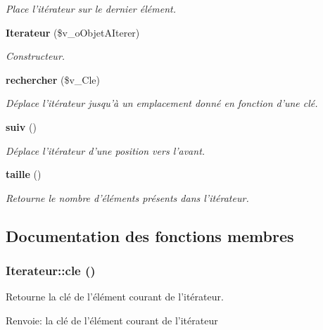 \begin{CompactItemize}
\begin{CompactList}\small\item\em Place l'itérateur sur le dernier élément. \item\end{CompactList}\item 
{\bf Iterateur} (\$v\_\-oObjetAIterer)
\begin{CompactList}\small\item\em Constructeur. \item\end{CompactList}\item 
{\bf rechercher} (\$v\_\-Cle)
\begin{CompactList}\small\item\em Déplace l'itérateur jusqu'à un emplacement donné en fonction d'une clé. \item\end{CompactList}\item 
{\bf suiv} ()\label{class_iterateur_b49e1eadf71ee40a816ed2d5134e0ba7}

\begin{CompactList}\small\item\em Déplace l'itérateur d'une position vers l'avant. \item\end{CompactList}\item 
{\bf taille} ()
\begin{CompactList}\small\item\em Retourne le nombre d'éléments présents dans l'itérateur. \item\end{CompactList}\end{CompactItemize}


\subsection{Documentation des fonctions membres}
\subsubsection{\setlength{\rightskip}{0pt plus 5cm}Iterateur::cle ()}\label{class_iterateur_0bc2b87d3fa65a6df5c4d5134402d4ba}


Retourne la clé de l'élément courant de l'itérateur. 

\begin{Desc}
\item[Renvoie:]la clé de l'élément courant de l'itérateur \end{Desc}


